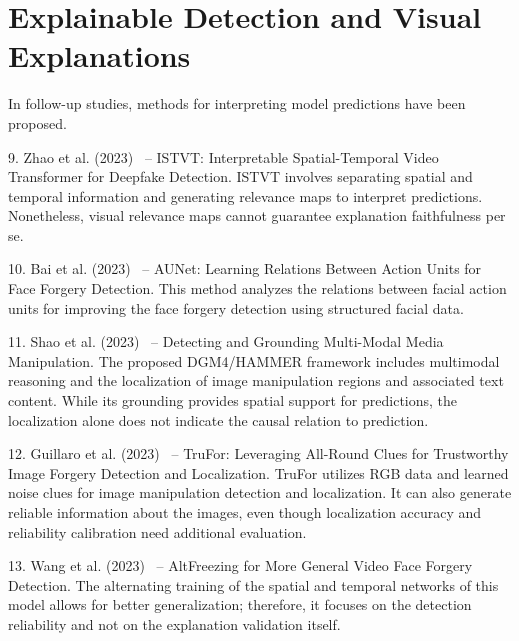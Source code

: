 \documentclass[12pt,a4wide]{report}
\theoremstyle{plain}
\theoremstyle{definition}
\theoremstyle{remark}
\begin{document}
\section{Explainable Detection and Visual Explanations}
\label{sec:detection}

In follow-up studies, methods for interpreting model predictions have been proposed.

\begin{description}

\item 9. Zhao et al. (2023)~\cite{zhao2023istvt} – ISTVT: Interpretable Spatial-Temporal Video Transformer for Deepfake Detection. ISTVT involves separating spatial and temporal information and generating relevance maps to interpret predictions. Nonetheless, visual relevance maps cannot guarantee explanation faithfulness per se.

\item 10. Bai et al. (2023)~\cite{bai2023aunet} – AUNet: Learning Relations Between Action Units for Face Forgery Detection. This method analyzes the relations between facial action units for improving the face forgery detection using structured facial data.

\item 11. Shao et al. (2023)~\cite{shao2023dgm4} – Detecting and Grounding Multi-Modal Media Manipulation. The proposed DGM4/HAMMER framework includes multimodal reasoning and the localization of image manipulation regions and associated text content. While its grounding provides spatial support for predictions, the localization alone does not indicate the causal relation to prediction.

\item 12. Guillaro et al. (2023)~\cite{guillaro2023trufor} – TruFor: Leveraging All-Round Clues for Trustworthy Image Forgery Detection and Localization. TruFor utilizes RGB data and learned noise clues for image manipulation detection and localization. It can also generate reliable information about the images, even though localization accuracy and reliability calibration need additional evaluation.

\item 13. Wang et al. (2023)~\cite{wang2023altfreezing} – AltFreezing for More General Video Face Forgery Detection. The alternating training of the spatial and temporal networks of this model allows for better generalization; therefore, it focuses on the detection reliability and not on the explanation validation itself.


\end{description}
\end{document}
